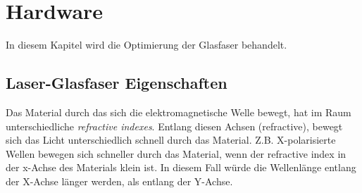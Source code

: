\section{Hardware}
In diesem Kapitel wird die Optimierung der Glasfaser behandelt.

\subsection{Laser-Glasfaser Eigenschaften}
Das Material durch das sich die elektromagnetische Welle bewegt, hat im Raum unterschiedliche \textit{refractive indexes}. Entlang diesen Achsen (refractive), bewegt sich das Licht unterschiedlich schnell durch das Material. Z.B. X-polarisierte Wellen bewegen sich schneller durch das Material, wenn der refractive index in der x-Achse des Materials klein ist. In diesem Fall würde die Wellenlänge entlang der X-Achse länger werden, als entlang der Y-Achse.